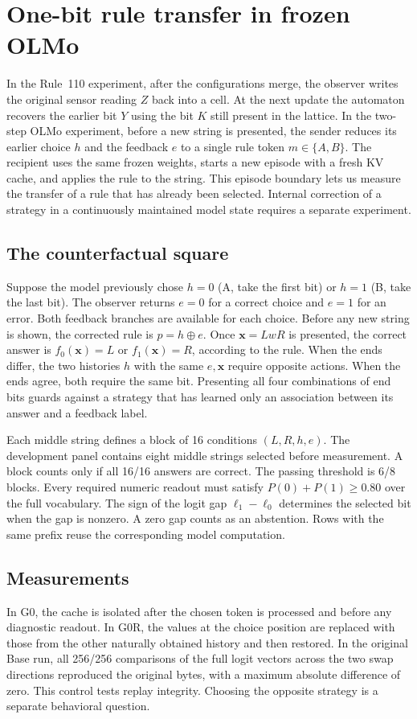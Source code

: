 \section{One-bit rule transfer in frozen OLMo}
\label{sec:olmo}
In the Rule~110 experiment, after the configurations merge, the observer writes the original sensor reading $Z$ back into a cell. At the next update the automaton recovers the earlier bit $Y$ using the bit $K$ still present in the lattice. In the two-step OLMo experiment, before a new string is presented, the sender reduces its earlier choice $h$ and the feedback $e$ to a single rule token $m\in\{A,B\}$. The recipient uses the same frozen weights, starts a new episode with a fresh KV cache, and applies the rule to the string. This episode boundary lets us measure the transfer of a rule that has already been selected. Internal correction of a strategy in a continuously maintained model state requires a separate experiment.

\subsection{The counterfactual square}
Suppose the model previously chose $h=0$ (A, take the first bit) or $h=1$ (B, take the last bit). The observer returns $e=0$ for a correct choice and $e=1$ for an error. Both feedback branches are available for each choice. Before any new string is shown, the corrected rule is $p=h\oplus e$. Once $\mathbf{x}=LwR$ is presented, the correct answer is $f_0(\mathbf{x})=L$ or $f_1(\mathbf{x})=R$, according to the rule. When the ends differ, the two histories $h$ with the same $e,\mathbf{x}$ require opposite actions. When the ends agree, both require the same bit. Presenting all four combinations of end bits guards against a strategy that has learned only an association between its answer and a feedback label.

Each middle string defines a block of 16 conditions $(L,R,h,e)$. The development panel contains eight middle strings selected before measurement. A block counts only if all 16/16 answers are correct. The passing threshold is 6/8 blocks. Every required numeric readout must satisfy $P(0)+P(1)\ge0.80$ over the full vocabulary. The sign of the logit gap $\ell_1-\ell_0$ determines the selected bit when the gap is nonzero. A zero gap counts as an abstention. Rows with the same prefix reuse the corresponding model computation.

\subsection{Measurements}
In G0, the cache is isolated after the chosen token is processed and before any diagnostic readout. In G0R, the values at the choice position are replaced with those from the other naturally obtained history and then restored. In the original Base run, all 256/256 comparisons of the full logit vectors across the two swap directions reproduced the original bytes, with a maximum absolute difference of zero. This control tests replay integrity. Choosing the opposite strategy is a separate behavioral question.

